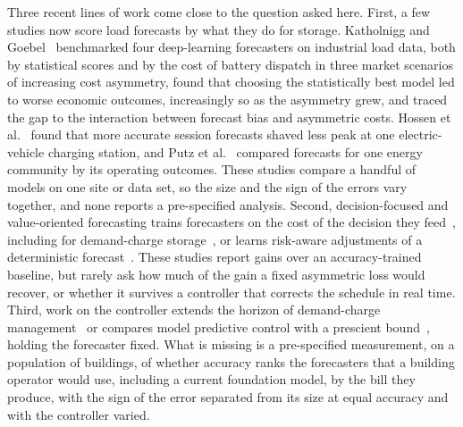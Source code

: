 Three recent lines of work come close to the question asked here. First, a few studies now score load forecasts by what they do for storage. Katholnigg and Goebel~\cite{katholnigg2025impact} benchmarked four deep-learning forecasters on industrial load data, both by statistical scores and by the cost of battery dispatch in three market scenarios of increasing cost asymmetry, found that choosing the statistically best model led to worse economic outcomes, increasingly so as the asymmetry grew, and traced the gap to the interaction between forecast bias and asymmetric costs. Hossen et al.~\cite{hossen2026ptoev} found that more accurate session forecasts shaved less peak at one electric-vehicle charging station, and Putz et al.~\cite{putz2023truevalue} compared forecasts for one energy community by its operating outcomes. These studies compare a handful of models on one site or data set, so the size and the sign of the errors vary together, and none reports a pre-specified analysis. Second, decision-focused and value-oriented forecasting trains forecasters on the cost of the decision they feed~\cite{donti2017task,elmachtoub2022spo,mandi2024dfl,zhang2025valueoriented,smets2025valueprice,depoortere2026dfl}, including for demand-charge storage~\cite{kim2025neural}, or learns risk-aware adjustments of a deterministic forecast~\cite{valle2027riskaware}. These studies report gains over an accuracy-trained baseline, but rarely ask how much of the gain a fixed asymmetric loss would recover, or whether it survives a controller that corrects the schedule in real time. Third, work on the controller extends the horizon of demand-charge management~\cite{cortesaguirre2025empc} or compares model predictive control with a prescient bound~\cite{perezpineiro2026tiered}, holding the forecaster fixed. What is missing is a pre-specified measurement, on a population of buildings, of whether accuracy ranks the forecasters that a building operator would use, including a current foundation model, by the bill they produce, with the sign of the error separated from its size at equal accuracy and with the controller varied.

